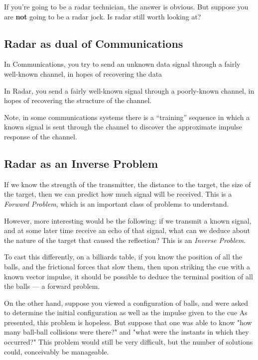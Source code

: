 If you're going to be a radar technician, the answer is obvious.  But
suppose you are \textbf{not} going to be a radar jock.  Is radar still
worth looking at?

\subsection{Radar as dual of Communications}

In Communications, you try to send an unknown data signal through a fairly
well-known channel, in hopes of recovering the data

In Radar, you send a fairly well-known signal through a poorly-known
channel, in hopes of recovering the structure of the channel.

Note, in some communications systems there is a ``training'' sequence
in which a known signal is sent through the channel to discover the
approximate impulse response of the channel.

\subsection{Radar as an Inverse Problem}

If we know the strength of the transmitter, the distance to the target, the size of the target, 
then we can predict how much signal will be received.  This is a \textit{Forward Problem}, 
which is an important class of problems to understand.  

However, more interesting would be the following: if we transmit a known signal, and at some
later time receive an echo of that signal, what can we deduce about the nature of the target that 
caused the reflection?  This is an \textit{Inverse Problem}.

To cast this differently, on a billiards table, if you know the position of all the balls, and the frictional
forces that slow them, then upon striking the cue with a known vector impulse, it should be possible
to deduce the terminal position of all the balls --- a forward problem.

On the other hand, suppose you viewed a configuration of balls, and were asked to determine the initial 
configuration as well as  the impulse given to the cue
As presented, this problem is hopeless.   But suppose that one was able to know "how many ball-ball
collisions were there?" and "what were the instants in which they occurred?"  This problem would still
be very difficult, but the number of solutions could, conceivably be manageable.


